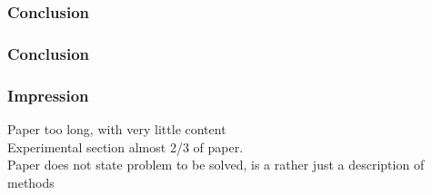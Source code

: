 \begin{frame}
\frametitle{Conclusion}



\end{frame}





\begin{frame}
\frametitle{Conclusion}



\end{frame}

\begin{frame}
\frametitle{Impression}

Paper too long, with very little content\\
\vspace{1em}
Experimental section almost 2/3 of paper.\\
\vspace{1em}
Paper does not state problem to be solved, is a rather just a description of methods\\

\end{frame}